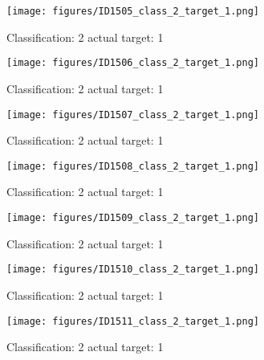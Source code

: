 \begin{figure}[h!]
\begin{center}
\texttt{[image: figures/ID1505\_class\_2\_target\_1.png]}
\end{center}
\caption{ Classification: 2 actual target: 1}
\label{fig:ID1505_class_2_target_1}
\end{figure}
\begin{figure}[h!]
\begin{center}
\texttt{[image: figures/ID1506\_class\_2\_target\_1.png]}
\end{center}
\caption{ Classification: 2 actual target: 1}
\label{fig:ID1506_class_2_target_1}
\end{figure}
\begin{figure}[h!]
\begin{center}
\texttt{[image: figures/ID1507\_class\_2\_target\_1.png]}
\end{center}
\caption{ Classification: 2 actual target: 1}
\label{fig:ID1507_class_2_target_1}
\end{figure}
\begin{figure}[h!]
\begin{center}
\texttt{[image: figures/ID1508\_class\_2\_target\_1.png]}
\end{center}
\caption{ Classification: 2 actual target: 1}
\label{fig:ID1508_class_2_target_1}
\end{figure}
\begin{figure}[h!]
\begin{center}
\texttt{[image: figures/ID1509\_class\_2\_target\_1.png]}
\end{center}
\caption{ Classification: 2 actual target: 1}
\label{fig:ID1509_class_2_target_1}
\end{figure}
\begin{figure}[h!]
\begin{center}
\texttt{[image: figures/ID1510\_class\_2\_target\_1.png]}
\end{center}
\caption{ Classification: 2 actual target: 1}
\label{fig:ID1510_class_2_target_1}
\end{figure}
\begin{figure}[h!]
\begin{center}
\texttt{[image: figures/ID1511\_class\_2\_target\_1.png]}
\end{center}
\caption{ Classification: 2 actual target: 1}
\label{fig:ID1511_class_2_target_1}
\end{figure}
